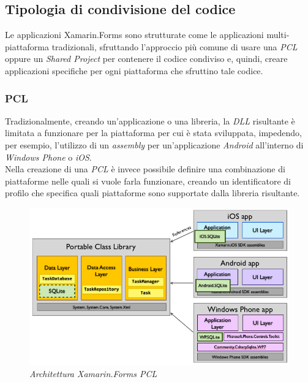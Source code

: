 \subsection{Tipologia di condivisione del codice}
Le applicazioni Xamarin.Forms sono strutturate come le applicazioni multi-piattaforma tradizionali, sfruttando l'approccio più comune di usare una \textit{PCL} oppure un \textit{Shared Project} per contenere il codice condiviso e, quindi, creare applicazioni specifiche per ogni piattaforma che sfruttino tale codice. 
\subsubsection{PCL}
Tradizionalmente, creando un'applicazione o una libreria, la \textit{DLL} risultante è limitata a funzionare per la piattaforma per cui è stata sviluppata, impedendo, per esempio, l'utilizzo di un \textit{assembly} per un'applicazione \textit{Android} all'interno di \textit{Windows Phone} o \textit{iOS}.
\\
Nella creazione di una \textit{PCL} è invece possibile definire una combinazione di piattaforme nelle quali si vuole farla funzionare, creando un identificatore di profilo che specifica quali piattaforme sono supportate dalla libreria risultante.

\begin{figure}[ht]
	\centering
	\includegraphics[scale=0.30]{immagini/progettazione/PortableClassLibrary.png}
	\caption{\textit{Architettura Xamarin.Forms PCL}}
\end{figure}\FloatBarrier

